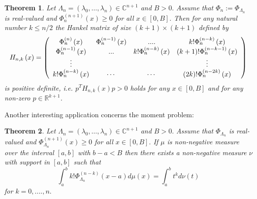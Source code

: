 \documentclass[11pt]{article}%
\newtheorem{theorem}{Theorem}
\begin{document}
\begin{theorem}
\label{ThmMain2}Let $\Lambda_{n}=\left(  \lambda_{0},\ldots,\lambda
_{n}\right)  \in\mathbb{C}^{n+1}$ and $B>0.$ Assume that $\Phi_{n}%
:=\Phi_{\Lambda_{n}}$ is real-valued and $\Phi_{n}^{\left(  n+1\right)
}\left(  x\right)  \geq0$ for all $x\in\left[  0,B\right]  .$ Then for any
natural number $k\leq n/2$ the Hankel matrix of size $\left(  k+1\right)
\times\left(  k+1\right)  $ defined by
\[
H_{n,k}\left(  x\right)  =\left(
\begin{array}
[c]{cccc}%
\Phi_{n}^{\left(  n\right)  }\left(  x\right)  & \Phi_{n}^{\left(  n-1\right)
}\left(  x\right)  & .... & k!\Phi_{n}^{\left(  n-k\right)  }\left(  x\right)
\\
\Phi_{n}^{\left(  n-1\right)  }\left(  x\right)  & ... & k!\Phi_{n}^{\left(
n-k\right)  }\left(  x\right)  & \left(  k+1\right)  !\Phi_{n}^{\left(
n-k-1\right)  }\left(  x\right) \\
\vdots &  &  & \vdots\\
k!\Phi_{n}^{\left(  n-k\right)  }\left(  x\right)  & \cdots & \cdots & \left(
2k\right)  !\Phi_{n}^{\left(  n-2k\right)  }\left(  x\right)
\end{array}
\right)
\]
is positive definite, i.e. $p^{T}H_{n,k}\left(  x\right)  p>0$ holds for any
$x\in\left[  0,B\right]  $ and for any non-zero $p\in\mathbb{R}^{k+1}$.
\end{theorem}

Another interesting application concerns the moment problem:

\begin{theorem}
\label{ThmMain3}Let $\Lambda_{n}=\left(  \lambda_{0},\ldots,\lambda
_{n}\right)  \in\mathbb{C}^{n+1}$ and $B>0.$ Assume that $\Phi_{\Lambda_{n}}$
is real-valued and $\Phi_{\Lambda_{n}}^{\left(  n+1\right)  }\left(  x\right)
\geq0$ for all $x\in\left[  0,B\right]  .$ If $\mu$ is non-negative measure
over the interval $\left[  a,b\right]  $ with $b-a<B$ then there exists a
non-negative measure $\nu$ with support in $\left[  a,b\right]  $ such that
\[
\int_{a}^{b}k!\Phi_{\Lambda_{n}}^{\left(  n-k\right)  }\left(  x-a\right)
d\mu\left(  x\right)  =\int_{a}^{b}t^{k}d\nu\left(  t\right)
\]
for $k=0,....,n.$
\end{theorem}
\end{document}
